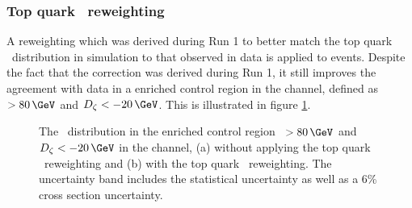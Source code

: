 \subsubsection*{Top quark \pT~reweighting}
A reweighting which was derived during Run 1
to better match the top quark \pT~distribution in simulation
to that observed in data is applied to \ttbar events. Despite
the fact that the correction was derived during Run 1, it still
improves the agreement with data in a \ttbar enriched
control region in the \emu channel, defined as 
\MET~$>80\,\GeV$ and $D_{\zeta}<-20\,\GeV$. This
is illustrated in figure \ref{fig:mssm_corrs_toppt}.
\begin{figure}[h!]
\begin{center}
\end{center}
\caption[The \mTtot~distribution in the \ttbar
enriched control region, with and without applying top quark \pT~reweighting.]{The \mTtot~distribution in the \ttbar enriched control region \MET~$>80\,\GeV$ and $D_{\zeta}<-20\,\GeV$ in the \emu channel,
(a) without applying the top quark \pT~reweighting and (b) with the top quark \pT~reweighting.
The uncertainty band includes the statistical uncertainty as well as a 6\% \ttbar cross section uncertainty.}
\label{fig:mssm_corrs_toppt}
\end{figure}

